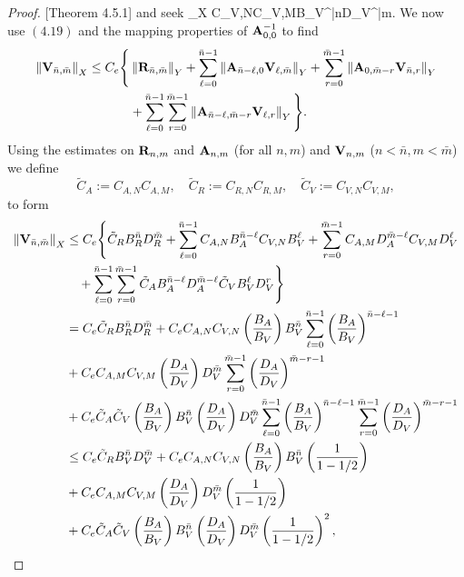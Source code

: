 \begin{proof}{[Theorem 4.5.1]}
\ees
and seek
\bes
{}_X \leq C_{V,N}C_{V,M}B_V^{\bar{n}}D_V^{\bar{m}}.
\ees
We now use $(4.19)$ and the mapping properties of $\mathbf{A}_{0,0}^{-1}$ to find
\begin{align*}
\left\lVert\mathbf{V}_{\bar{n},\bar{m}}\right\rVert_X\leq C_e\Bigg\{&\left\lVert\mathbf{R}_{\bar{n},\bar{m}}\right\rVert_Y+\sum_{\ell=0}^{\bar{n}-1}\left\lVert\mathbf{A}_{\bar{n}-\ell,0}\mathbf{V}_{\ell,\bar{m}}\right\rVert_Y+\sum_{r=0}^{\bar{m}-1}\left\lVert\mathbf{A}_{0,\bar{m}-r}\mathbf{V}_{\bar{n},r}\right\rVert_Y\\&
+\sum_{\ell=0}^{\bar{n}-1}\sum_{r=0}^{\bar{m}-1}\left\lVert\mathbf{A}_{\bar{n}-\ell,\bar{m}-r}\mathbf{V}_{\ell,r}\right\rVert_Y\Bigg\}.
\end{align*}
Using the estimates on $\mathbf{R}_{n,m}$ and $\mathbf{A}_{n,m}$ (for all $n,m$) and $\mathbf{V}_{n,m}$ ($n<\bar{n},m<\bar{m}$) we define
$$\tilde{C}_A := C_{A,N}C_{A,M}, \quad \tilde{C}_R := C_{R,N}C_{R,M}, \quad \tilde{C}_V := C_{V,N}C_{V,M},$$
to form
\begin{align*}
\left\lVert\mathbf{V}_{\bar{n},\bar{m}}\right\rVert_X&\leq
C_e\Bigg\{\tilde{C}_RB_R^{\bar{n}}D_R^{\bar{m}}+\sum_{\ell=0}^{\bar{n}-1}C_{A,N}B_A^{\bar{n}-\ell}C_{V,N}B_V^{\ell} +\sum_{r=0}^{\bar{m}-1}C_{A,M}D_A^{\bar{m}-\ell}C_{V,M}D_V^{\ell}
\\&\quad +\sum_{\ell=0}^{\bar{n}-1}\sum_{r=0}^{\bar{m}-1}\tilde{C}_AB_A^{\bar{n}-\ell}D_A^{\bar{m}-\ell}\tilde{C}_VB_V^{\ell}D_V^r\Bigg\} \\&=
C_e\tilde{C}_RB_R^{\bar{n}}D_R^{\bar{m}} + C_eC_{A,N}C_{V,N}\left(\frac{B_A}{B_V}\right)B_V^{\bar{n}}\sum_{\ell=0}^{\bar{n}-1}\left(\frac{B_A}{B_V}\right)^{\bar{n}-\ell - 1} \\&+
C_eC_{A,M}C_{V,M}\left(\frac{D_A}{D_V}\right)D_V^{\bar{m}}\sum_{r=0}^{\bar{m}-1}\left(\frac{D_A}{D_V}\right)^{\bar{m}-r - 1}\\& 
+C_e\tilde{C}_A\tilde{C}_V
\left(\frac{B_A}{B_V}\right)B_V^{\bar{n}}\left(\frac{D_A}{D_V}\right)D_V^{\bar{m}}\sum_{\ell=0}^{\bar{n}-1}\left(\frac{B_A}{B_V}\right)^{\bar{n}-\ell - 1}\sum_{r=0}^{\bar{m}-1}\left(\frac{D_A}{D_V}\right)^{\bar{m}-r - 1}\\& \leq
C_e\tilde{C}_RB_V^{\bar{n}}D_V^{\bar{m}} +
C_eC_{A,N}C_{V,N}\left(\frac{B_A}{B_V}\right)B_V^{\bar{n}}\left(\frac{1}{1-1/2}\right) \\&+
C_eC_{A,M}C_{V,M}\left(\frac{D_A}{D_V}\right)D_V^{\bar{m}}\left(\frac{1}{1-1/2}\right) \\&+ 
C_e\tilde{C}_A\tilde{C}_V\left(\frac{B_A}{B_V}\right)B_V^{\bar{n}}\left(\frac{D_A}{D_V}\right)D_V^{\bar{m}}\left(\frac{1}{1-1/2}\right)^2,
\end{align*}

\end{proof}
